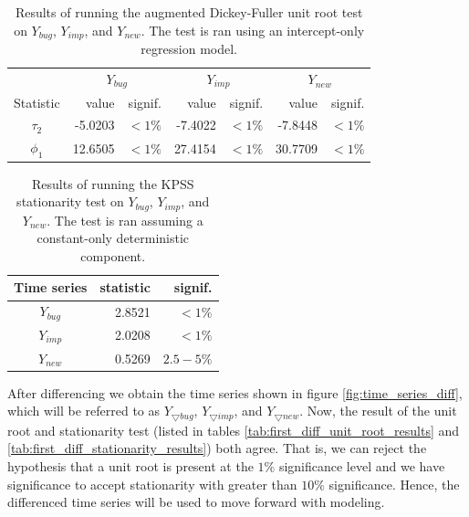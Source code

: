 \documentclass[a4paper]{scrartcl}
\begin{document}
\begin{table}[h!]
  \centering
  \begin{tabular}{ c | r r | r r | r r }
      & \multicolumn{2}{|c|}{$Y_{bug}$} & \multicolumn{2}{|c|}{$Y_{imp}$} & \multicolumn{2}{|c}{$Y_{new}$} \\
    Statistic & value & signif. & value & signif. & value & signif. \\
    \hline
    $\tau_2$ & -5.0203 & $< 1\%$ & -7.4022 & $< 1\%$ & -7.8448 & $< 1\%$ \\
    $\phi_1$ & 12.6505 & $< 1\%$ & 27.4154 & $< 1\%$ & 30.7709 & $< 1\%$ \\
    \hline
  \end{tabular}
\caption{Results of running the augmented Dickey-Fuller unit root test on $Y_{bug}$, $Y_{imp}$, and $Y_{new}$. The test is ran using an intercept-only regression model.}
\label{tab:unit_root_results}
\end{table}

\begin{table}[h!]
  \centering
  \begin{tabular}{ c | r r }
    Time series & statistic & signif. \\
    \hline
    $Y_{bug}$ & 2.8521 & $< 1\%$ \\
    $Y_{imp}$ & 2.0208 & $< 1\%$ \\
    $Y_{new}$ & 0.5269 & $2.5-5\%$ \\
    \hline
  \end{tabular}
\caption{Results of running the KPSS stationarity test on $Y_{bug}$, $Y_{imp}$, and $Y_{new}$. The test is ran assuming a constant-only deterministic component.}
\label{tab:stationarity_results}
\end{table}

After differencing we obtain the time series shown in figure \ref{fig:time_series_diff}, which will be referred to as $Y_{\bigtriangledown bug}$, $Y_{\bigtriangledown imp}$, and $Y_{\bigtriangledown new}$. Now, the result of the unit root and stationarity test (listed in tables \ref{tab:first_diff_unit_root_results} and \ref{tab:first_diff_stationarity_results}) both agree. That is, we can reject the hypothesis that a unit root is present at the $1\%$  significance level and we have significance to accept stationarity with greater than $10\%$ significance. Hence, the differenced time series will be used to move forward with modeling.
\end{document}

